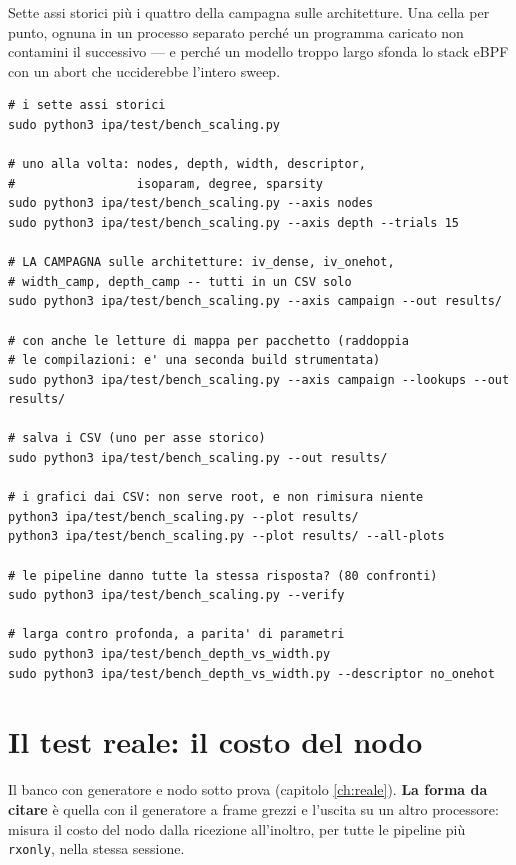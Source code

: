 \documentclass[11pt,a4paper,oneside]{report}
\begin{document}
Sette assi storici più i quattro della campagna sulle architetture. Una
cella per punto, ognuna in un processo separato perché un programma caricato
non contamini il successivo --- e perché un modello troppo largo sfonda lo
stack eBPF con un abort che ucciderebbe l'intero sweep.

\begin{lstlisting}
# i sette assi storici
sudo python3 ipa/test/bench_scaling.py

# uno alla volta: nodes, depth, width, descriptor,
#                 isoparam, degree, sparsity
sudo python3 ipa/test/bench_scaling.py --axis nodes
sudo python3 ipa/test/bench_scaling.py --axis depth --trials 15

# LA CAMPAGNA sulle architetture: iv_dense, iv_onehot,
# width_camp, depth_camp -- tutti in un CSV solo
sudo python3 ipa/test/bench_scaling.py --axis campaign --out results/

# con anche le letture di mappa per pacchetto (raddoppia
# le compilazioni: e' una seconda build strumentata)
sudo python3 ipa/test/bench_scaling.py --axis campaign --lookups --out results/

# salva i CSV (uno per asse storico)
sudo python3 ipa/test/bench_scaling.py --out results/

# i grafici dai CSV: non serve root, e non rimisura niente
python3 ipa/test/bench_scaling.py --plot results/
python3 ipa/test/bench_scaling.py --plot results/ --all-plots

# le pipeline danno tutte la stessa risposta? (80 confronti)
sudo python3 ipa/test/bench_scaling.py --verify

# larga contro profonda, a parita' di parametri
sudo python3 ipa/test/bench_depth_vs_width.py
sudo python3 ipa/test/bench_depth_vs_width.py --descriptor no_onehot
\end{lstlisting}

\section{Il test reale: il costo del nodo}

Il banco con generatore e nodo sotto prova (capitolo \ref{ch:reale}). \textbf{La
forma da citare} è quella con il generatore a frame grezzi e l'uscita su un altro
processore: misura il costo del nodo dalla ricezione all'inoltro, per tutte le
pipeline più \texttt{rxonly}, nella stessa sessione.
\end{document}
